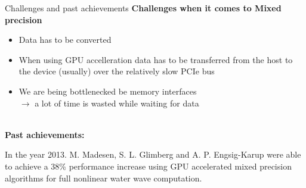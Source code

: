 \documentclass[10pt]{beamer}
\begin{document}
\begin{frame}{Challenges and past achievements}
 \textbf{Challenges when it comes to Mixed precision}
\begin{itemize}
 \item Data has to be converted
 \item When using GPU accelleration data has to be transferred from the host to the device (usually) over the relatively slow PCIe bus
 \item We are being bottlenecked be memory interfaces\\
 $\rightarrow$ a lot of time is wasted while waiting for data
\end{itemize}
~\\
  \textbf{Past achievements:}~\\
\begin{center}
  In the year 2013. M. Madesen, S. L. Glimberg and A. P. Engsig-Karup were able to
  achieve a \color{red}38\% performance increase \color{black} using GPU accelerated mixed precision 
  algorithms for full nonlinear water wave computation.\cite{waterwavecomp}
\end{center}
\end{frame}


% 
\end{document}
